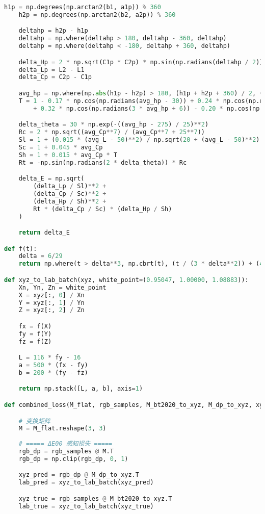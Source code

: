 \begin{lstlisting}[language=Python]
    h1p = np.degrees(np.arctan2(b1, a1p)) % 360
    h2p = np.degrees(np.arctan2(b2, a2p)) % 360

    deltahp = h2p - h1p
    deltahp = np.where(deltahp > 180, deltahp - 360, deltahp)
    deltahp = np.where(deltahp < -180, deltahp + 360, deltahp)

    delta_Hp = 2 * np.sqrt(C1p * C2p) * np.sin(np.radians(deltahp / 2))
    delta_Lp = L2 - L1
    delta_Cp = C2p - C1p

    avg_hp = np.where(np.abs(h1p - h2p) > 180, (h1p + h2p + 360) / 2, (h1p + h2p) / 2)
    T = 1 - 0.17 * np.cos(np.radians(avg_hp - 30)) + 0.24 * np.cos(np.radians(2 * avg_hp)) \
        + 0.32 * np.cos(np.radians(3 * avg_hp + 6)) - 0.20 * np.cos(np.radians(4 * avg_hp - 63))

    delta_theta = 30 * np.exp(-((avg_hp - 275) / 25)**2)
    Rc = 2 * np.sqrt((avg_Cp**7) / (avg_Cp**7 + 25**7))
    Sl = 1 + (0.015 * (avg_L - 50)**2) / np.sqrt(20 + (avg_L - 50)**2)
    Sc = 1 + 0.045 * avg_Cp
    Sh = 1 + 0.015 * avg_Cp * T
    Rt = -np.sin(np.radians(2 * delta_theta)) * Rc

    delta_E = np.sqrt(
        (delta_Lp / Sl)**2 +
        (delta_Cp / Sc)**2 +
        (delta_Hp / Sh)**2 +
        Rt * (delta_Cp / Sc) * (delta_Hp / Sh)
    )

    return delta_E

def f(t):
    delta = 6/29
    return np.where(t > delta**3, np.cbrt(t), (t / (3 * delta**2)) + (4/29))

def xyz_to_lab_batch(xyz, white_point=(0.95047, 1.00000, 1.08883)):
    Xn, Yn, Zn = white_point
    X = xyz[:, 0] / Xn
    Y = xyz[:, 1] / Yn
    Z = xyz[:, 2] / Zn

    fx = f(X)
    fy = f(Y)
    fz = f(Z)

    L = 116 * fy - 16
    a = 500 * (fx - fy)
    b = 200 * (fy - fz)

    return np.stack([L, a, b], axis=1)

def combined_loss(M_flat, rgb_samples, M_bt2020_to_xyz, M_dp_to_xyz, xyz_to_lab_batch):

    # 变换矩阵
    M = M_flat.reshape(3, 3)
    
    # ===== ΔE00 感知损失 =====
    rgb_dp = rgb_samples @ M.T
    rgb_dp = np.clip(rgb_dp, 0, 1)

    xyz_pred = rgb_dp @ M_dp_to_xyz.T
    lab_pred = xyz_to_lab_batch(xyz_pred)

    xyz_true = rgb_samples @ M_bt2020_to_xyz.T
    lab_true = xyz_to_lab_batch(xyz_true)


\end{lstlisting}
